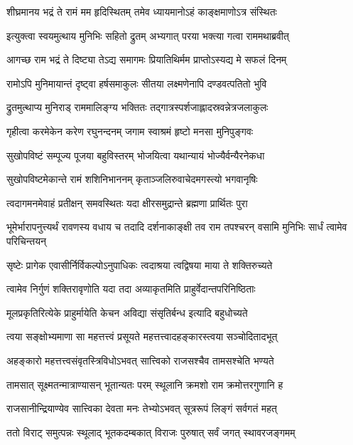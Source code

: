 \twolineshloka
{शीघ्रमानय भद्रं ते रामं मम हृदिस्थितम्}
{तमेव ध्यायमानोऽहं काङ्क्षमाणोऽत्र संस्थितः} %

\twolineshloka
{इत्युक्त्वा स्वयमुत्थाय मुनिभिः सहितो द्रुतम्}
{अभ्यगात् परया भक्त्या गत्वा राममथाब्रवीत्} %

\twolineshloka
{आगच्छ राम भद्रं ते दिष्ट्या तेऽद्य समागमः}
{प्रियातिथिर्मम प्राप्तोऽस्यद्य मे सफलं दिनम्} %

\twolineshloka
{रामोऽपि मुनिमायान्तं दृष्ट्वा हर्षसमाकुलः}
{सीतया लक्ष्मणेनापि दण्डवत्पतितो भुवि} %

\twolineshloka
{द्रुतमुत्थाप्य मुनिराड् राममालिङ्ग्य भक्तितः}
{तद्गात्रस्पर्शजाह्लादस्रवन्नेत्रजलाकुलः} %

\twolineshloka
{गृहीत्वा करमेकेन करेण रघुनन्दनम्}
{जगाम स्वाश्रमं हृष्टो मनसा मुनिपुङ्गवः} %

\twolineshloka
{सुखोपविष्टं सम्पूज्य पूजया बहुविस्तरम्}
{भोजयित्वा यथान्यायं भोज्यैर्वन्यैरनेकधा} %

\twolineshloka
{सुखोपविष्टमेकान्ते रामं शशिनिभाननम्}
{कृताञ्जलिरुवाचेदमगस्त्यो भगवानृषिः} %

\twolineshloka
{त्वदागमनमेवाहं प्रतीक्षन् समवस्थितः}
{यदा क्षीरसमुद्रान्ते ब्रह्मणा प्रार्थितः पुरा} %

\threelineshloka
{भूमेर्भारापनुत्त्यर्थं रावणस्य वधाय च}
{तदादि दर्शनाकाङ्क्षी तव राम तपश्चरन्}
{वसामि मुनिभिः सार्धं त्वामेव परिचिन्तयन्} %

\twolineshloka
{सृष्टेः प्रागेक एवासीर्निर्विकल्पोऽनुपाधिकः}
{त्वदाश्रया त्वद्विषया माया ते शक्तिरुच्यते} %

\twolineshloka
{त्वामेव निर्गुणं शक्तिरावृणोति यदा तदा}
{अव्याकृतमिति प्राहुर्वेदान्तपरिनिष्ठिताः} %

\twolineshloka
{मूलप्रकृतिरित्येके प्राहुर्मायेति केचन}
{अविद्या संसृतिर्बन्ध इत्यादि बहुधोच्यते} %

\twolineshloka
{त्वया सङ्क्षोभ्यमाणा सा महत्तत्त्वं प्रसूयते}
{महत्तत्त्वादहङ्कारस्त्वया सञ्चोदितादभूत्} %

\twolineshloka
{अहङ्कारो महत्तत्त्वसंवृतस्त्रिविधोऽभवत्}
{सात्त्विको राजसश्चैव तामसश्चेति भण्यते} %

\twolineshloka
{तामसात् सूक्ष्मतन्मात्राण्यासन् भूतान्यतः परम्}
{स्थूलानि क्रमशो राम क्रमोत्तरगुणानि ह} %

\twolineshloka
{राजसानीन्द्रियाण्येव सात्त्विका देवता मनः}
{तेभ्योऽभवत् सूत्ररूपं लिङ्गं सर्वगतं महत्} %

\twolineshloka
{ततो विराट् समुत्पन्नः स्थूलाद् भूतकदम्बकात्}
{विराजः पुरुषात् सर्वं जगत् स्थावरजङ्गमम्} %

